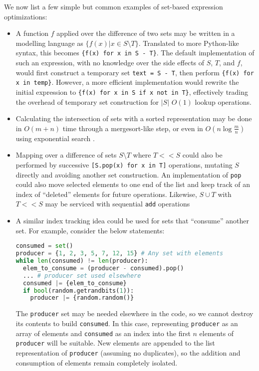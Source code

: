 \documentclass{article}
\begin{document}
We now list a few simple but common examples of set-based expression optimizations:
\begin{itemize}
  \item A function $f$ applied over the difference of two sets may be written in a modelling language as $\{f(x) | x \in S \setminus T\}$. Translated to more Python-like syntax, this becomes \texttt{\{f(x) for x in S - T\}}. The default implementation of such an expression, with no knowledge over the side effects of $S$, $T$, and $f$, would first construct a temporary set \texttt{text = S - T}, then perform \texttt{\{f(x) for x in temp\}}. However, a more efficient implementation would rewrite the initial expression to \texttt{\{f(x) for x in S if x not in T\}}, effectively trading the overhead of temporary set construction for $|S|$ $O(1)$ lookup operations.
  \item Calculating the intersection of sets with a sorted representation may be done in $O(m+n)$ time through a mergesort-like step, or even in $O(n\log{\frac{m}{n}})$ using exponential search \cite{sortedIntersectionStackOverflow}.
  \item Mapping over a difference of sets $S \setminus T$ where $T << S$ could also be performed by successive \texttt{[S.pop(x) for x in T]} operations, mutating $S$ directly and avoiding another set construction. An implementation of \texttt{pop} could also move selected elements to one end of the list and keep track of an index of ``deleted'' elements for future operations. Likewise, $S \cup T$ with $T << S$ may be serviced with sequential \texttt{add} operations
  \item A similar index tracking idea could be used for sets that ``consume'' another set. For example, consider the below statements:
  \begin{lstlisting}[language=python]
consumed = set()
producer = {1, 2, 3, 5, 7, 12, 15} # Any set with elements
while len(consumed) != len(producer):
  elem_to_consume = (producer - consumed).pop()
  ... # producer set used elsewhere
  consumed |= {elem_to_consume}
  if bool(random.getrandbits(1)):
    producer |= {random.random()}
\end{lstlisting}
  The \texttt{producer} set may be needed elsewhere in the code, so we cannot destroy its contents to build \texttt{consumed}. In this case, representing \texttt{producer} as an array of elements and \texttt{consumed} as an index into the first $n$ elements of \texttt{producer} will be suitable. New elements are appended to the list representation of \texttt{producer} (assuming no duplicates), so the addition and consumption of elements remain completely isolated.
\end{itemize}
\end{document}
